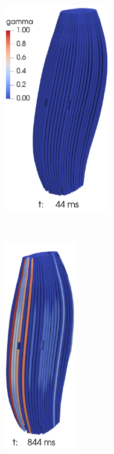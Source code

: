\begin{figure}
  \centering%
  \begin{subfigure}[t]{0.3\textwidth}%
    \centering%
    \includegraphics[height=9cm]{images/results/application/contraction_fibers_044.png}%
    \caption{}%
    \label{fig:contraction_fibers_044}%
  \end{subfigure} \,
  \begin{subfigure}[t]{0.18\textwidth}%
    \centering%
    \includegraphics[height=9cm]{images/results/application/contraction_fibers_844b.png}%
    \caption{}%
    \label{fig:contraction_fibers_844b}%
  \end{subfigure}\,
  \begin{subfigure}[t]{0.25\textwidth}%
    \centering%

\end{subfigure}
\end{figure}
